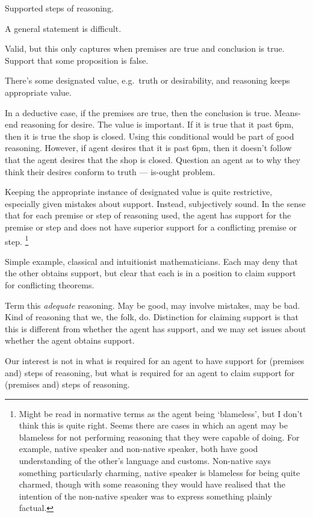 \begin{note}
  Supported steps of reasoning.

  A general statement is difficult.

  Valid, but this only captures when premises are true and conclusion is true.
  Support that some proposition is false.

  There's some designated value, e.g.\ truth or desirability, and reasoning keeps appropriate value.

  In a deductive case, if the premises are true, then the conclusion is true.
  Means-end reasoning for desire.
  The value is important.
  If it is true that it past 6pm, then it is true the shop is closed.
  Using this conditional would be part of good reasoning.
  However, if agent desires that it is past 6pm, then it doesn't follow that the agent desires that the shop is closed.
  Question an agent as to why they think their desires conform to truth --- is-ought problem.

  Keeping the appropriate instance of designated value is quite restrictive, especially given mistakes about support.
  Instead, subjectively sound.
  In the sense that for each premise or step of reasoning used, the agent has support for the premise or step and does not have superior support for a conflicting premise or step.\nolinebreak
  \footnote{
    Might be read in normative terms as the agent being `blameless', but I don't think this is quite right.
    Seems there are cases in which an agent may be blameless for not performing reasoning that they were capable of doing.
    For example, native speaker and non-native speaker, both have good understanding of the other's language and customs.
    Non-native says something particularly charming, native speaker is blameless for being quite charmed, though with some reasoning they would have realised that the intention of the non-native speaker was to express something plainly factual.
  }

  Simple example, classical and intuitionist mathematicians.
  Each may deny that the other obtains support, but clear that each is in a position to claim support for conflicting theorems.

  Term this \emph{adequate} reasoning.
  May be good, may involve mistakes, may be bad.
  Kind of reasoning that we, the folk, do.
  Distinction for claiming support is that this is different from whether the agent has support, and we may set issues about whether the agent obtains support.

  Our interest is not in what is required for an agent to have support for (premises and) steps of reasoning, but what is required for an agent to claim support for (premises and) steps of reasoning.
\end{note}

